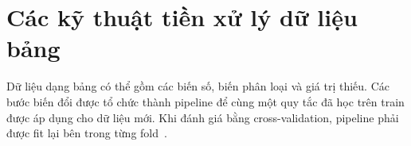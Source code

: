 \section{Các kỹ thuật tiền xử lý dữ liệu bảng}
\label{sec:2_2}
Dữ liệu dạng bảng có thể gồm các biến số, biến phân loại và giá trị thiếu. Các bước biến đổi được tổ chức thành pipeline để cùng một quy tắc đã học trên train được áp dụng cho dữ liệu mới. Khi đánh giá bằng cross-validation, pipeline phải được fit lại bên trong từng fold~\cite{sklearn-pitfalls}.




